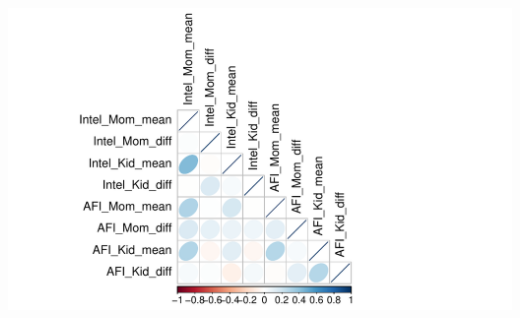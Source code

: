 \documentclass[a4paper,man,apacite,natbib,12pt]{apa6}\usepackage[]{graphicx}\usepackage[]{color}
\newenvironment{knitrout}{}{} %
\begin{document}
\pagebreak
%
\begin{center}
\label{plot_within}
\begin{knitrout}
\color{fgcolor}
\includegraphics[width=1.1\paperwidth]{figure/plot_corplotmatrix_within-1} 

\end{knitrout}
\end{center}

%
\appendix\label{appen}
%
\end{document}
